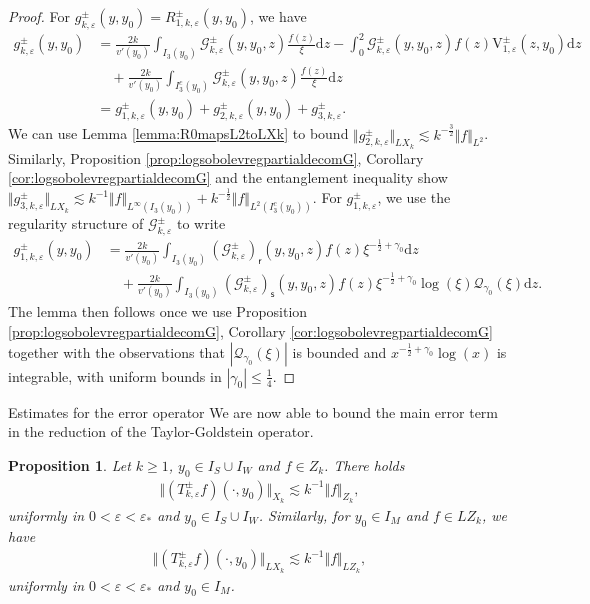 \documentclass[11pt,reqno]{amsproc}
\makeatletter
\renewcommand\subsection{\@startsection{subsection}{2}%
\normalparindent{.5\linespacing\@plus.7\linespacing}{-.5em}
{\normalfont\bfseries}}
\newtheorem{proposition}{Proposition}[section]
\theoremstyle{definition}
\numberwithin{equation}{section}
\newcommand{\G}{{\mathcal{G}}}
\newcommand{\Q}{{\mathcal{Q}}}
\newcommand{\sr}{{\mathsf{r}}}
\newcommand{\s}{{\mathsf{s}}}
\renewcommand{\d}{\mathrm{d}}
\newcommand{\ep}{\varepsilon}
\makeatother
\begin{document}
\begin{proof}
For $g_{k,\ep}^\pm(y,y_0) = R_{1,k,\ep}^\pm(y,y_0)$, we have
\begin{align*}
g_{k,\ep}^\pm(y,y_0) &= \frac{2k}{v'(y_0)}\int_{I_3(y_0)} \G_{k,\ep}^\pm(y,y_0,z)\frac{f(z)}{\xi}\d z - \int_0^2\G_{k,\ep}^\pm(y,y_0,z)f(z) \mathrm{V}_{1,\ep}^\pm(z,y_0) \d z \\
&\quad + \frac{2k}{v'(y_0)}\int_{I_3^c(y_0)} \G_{k,\ep}^\pm(y,y_0,z)\frac{f(z)}{\xi}\d z \\
&= g_{1,k,\ep}^\pm(y,y_0) + g_{2,k,\ep}^\pm(y,y_0) + g_{3,k,\ep}^\pm.
\end{align*}
We can use Lemma \ref{lemma:R0mapsL2toLXk} to bound $\Vert g_{2,k,\ep}^\pm \Vert_{LX_k}\lesssim k^{-\frac32}\Vert f \Vert_{L^2}$. Similarly, Proposition \ref{prop:logsobolevregpartialdecomG}, Corollary \ref{cor:logsobolevregpartialdecomG} and the entanglement inequality show $\Vert g_{3,k,\ep}^\pm \Vert_{LX_k}\lesssim k^{-1}\Vert f \Vert_{L^\infty(I_3(y_0))} + k^{-\frac12}\Vert f \Vert_{L^2(I_3^c(y_0))}$. For $g_{1,k,\ep}^\pm$, we use the regularity structure of $\G_{k,\ep}^\pm$ to write
\begin{align*}
g_{1,k,\ep}^\pm(y,y_0) &=  \frac{2k}{v'(y_0)}\int_{I_3(y_0)} \left( \G_{k,\ep}^\pm\right)_\sr(y,y_0,z)f(z) \xi^{-\frac12+\gamma_0} \d z \\
&\quad + \frac{2k}{v'(y_0)}\int_{I_3(y_0)} \left( \G_{k,\ep}^\pm\right)_\s(y,y_0,z)f(z) \xi^{-\frac12+\gamma_0} \log(\xi) \Q_{\gamma_0}(\xi)\d z.
\end{align*}
The lemma then follows once we use Proposition \ref{prop:logsobolevregpartialdecomG}, Corollary \ref{cor:logsobolevregpartialdecomG} together with the observations that $|\Q_{\gamma_0}(\xi)|$ is bounded and $x^{-\frac12+\gamma_0}\log(x)$ is integrable, with uniform bounds in $|\gamma_0|\leq \tfrac14$.
\end{proof}

\subsection{Estimates for the error operator}
We are now able to bound the main error term in the reduction of the Taylor-Goldstein operator.

\begin{proposition}\label{prop:TmapsXktoXk}
Let $k\geq 1$, $y_0\in I_S\cup I_W$ and $f\in Z_k$. There holds
\begin{align*}
\Vert (T_{k,\ep}^\pm f)(\cdot,y_0) \Vert_{X_k} \lesssim k^{-1}\Vert f \Vert_{Z_k},
\end{align*}
uniformly in $0<\ep<\ep_*$ and $y_0\in I_S\cup I_W$. Similarly, for $y_0\in I_M$ and $f \in LZ_k$, we have
\begin{align*}
\Vert (T_{k,\ep}^\pm f)(\cdot,y_0) \Vert_{LX_k} \lesssim k^{-1}\Vert f \Vert_{LZ_k},
\end{align*}
uniformly in $0<\ep<\ep_*$ and $y_0\in I_M$.
\end{proposition}
\end{document}
